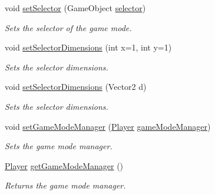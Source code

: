 \begin{DoxyCompactItemize}
void \mbox{\hyperlink{class_game_mode_a935569fe49afce6c4778b58fee12620c}{set\+Selector}} (Game\+Object \mbox{\hyperlink{class_game_mode_a01e79f1e24fe9681e06b53d81eb81293}{selector}})
\begin{DoxyCompactList}\small\item\em Sets the selector of the game mode. \end{DoxyCompactList}\item 
void \mbox{\hyperlink{class_game_mode_a6c6008ded1f901492808039a45b7a3af}{set\+Selector\+Dimensions}} (int x=1, int y=1)
\begin{DoxyCompactList}\small\item\em Sets the selector dimensions. \end{DoxyCompactList}\item 
void \mbox{\hyperlink{class_game_mode_a4c21d4c2047f2e8be9638133b536b200}{set\+Selector\+Dimensions}} (Vector2 d)
\begin{DoxyCompactList}\small\item\em Sets the selector dimensions. \end{DoxyCompactList}\item 
void \mbox{\hyperlink{class_game_mode_adfc4880129481cdc7012440d977d4ea5}{set\+Game\+Mode\+Manager}} (\mbox{\hyperlink{class_player}{Player}} \mbox{\hyperlink{class_game_mode_a5a2348927e4b11e88abaf1d2328eed60}{game\+Mode\+Manager}})
\begin{DoxyCompactList}\small\item\em Sets the game mode manager. \end{DoxyCompactList}\item 
\mbox{\hyperlink{class_player}{Player}} \mbox{\hyperlink{class_game_mode_aa8a0deab7115a3c5fcf42503691a9a52}{get\+Game\+Mode\+Manager}} ()
\begin{DoxyCompactList}\small\item\em Returns the game mode manager. \end{DoxyCompactList}\end{DoxyCompactItemize}
